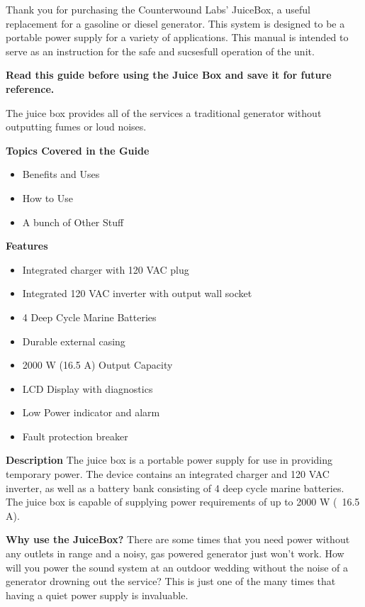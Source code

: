 \documentclass[../jb_user_manual.tex]{subfiles}
\begin{document}
\begin{flushleft}
Thank you for purchasing the Counterwound Labs' JuiceBox, a useful replacement for a gasoline or diesel generator. This system is designed to be a portable power supply for a variety of applications. This manual is intended to serve as an instruction for the safe and sucsesfull operation of the unit.

\vspace{2mm} 
\noindent 
\textbf{Read this guide before using the Juice Box and save it for future reference.}

\vspace{2mm}
The juice box provides all of the services a traditional generator without outputting fumes or loud noises.

\vspace{3mm}
\leftskip=0cm
\begin{Large}
	\textbf{Topics Covered in the Guide}
\end{Large}


\begin{itemize}
\setlength{\itemindent}{3mm} %
	\item Benefits and Uses
	\item How to Use
	\item A bunch of Other Stuff
\end{itemize}

\textbf{Features} \break
\begin{itemize}
	\item{Integrated charger with 120 VAC plug}
	\item{Integrated 120 VAC inverter with output wall socket}
	\item{4 Deep Cycle Marine Batteries}
	\item{Durable external casing}
	\item{2000 W (16.5 A) Output Capacity}
	\item{LCD Display with diagnostics}
	\item{Low Power indicator and alarm}
	\item{Fault protection breaker} 

\end{itemize}

\textbf{Description} \break 
The juice box is a portable power supply for use in providing temporary power.  The device contains an integrated charger and 120 VAC inverter, as well as a battery bank consisting of 4 deep cycle marine batteries.  The juice box is capable of supplying power requirements of up to 2000 W (~16.5 A).
 
\textbf{Why use the JuiceBox?} \break 
There are some times that you need power without any outlets in range and a noisy, gas powered generator just won't work. How will you power the sound system at an outdoor wedding without the noise of a generator drowning out the service? This is just one of the many times that having a quiet power supply is invaluable. 

\end{flushleft}
\end{document}
